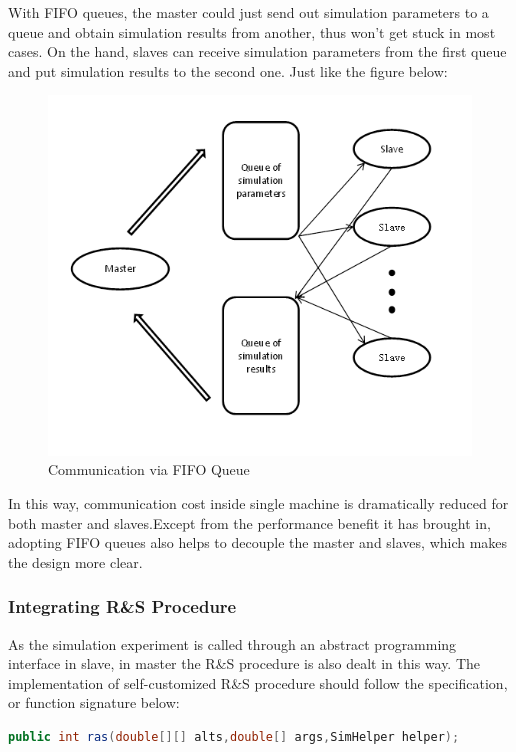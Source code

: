 With FIFO queues, the master could just send out simulation parameters to a queue and obtain simulation results from another, thus won't get stuck in most cases. On the hand, slaves can receive simulation parameters from the first queue and put simulation results to the second one. Just like the figure below:

\begin{figure}[ht]
\centering
\includegraphics[width=120mm]{master-slave-queue.png}
\caption{Communication via FIFO Queue}
\end{figure}

In this way, communication cost inside single machine is dramatically reduced for both master and slaves.Except from the performance benefit it has brought in, adopting FIFO queues also helps to decouple the master and slaves, which makes the design more clear.

\subsubsection{Integrating R\&S Procedure}

As the simulation experiment is called through an abstract programming interface in slave, in master the R\&S procedure is also dealt in this way. The implementation of self-customized R\&S procedure should follow the specification, or function signature below:

\begin{lstlisting}[language=Java]
public int ras(double[][] alts,double[] args,SimHelper helper);
\end{lstlisting}

